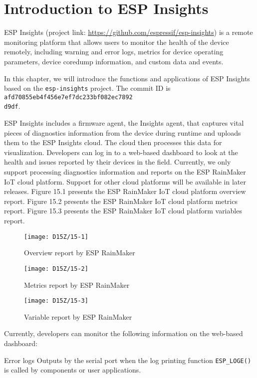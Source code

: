 \documentclass[a4paper,12pt]{book}
\begin{document}
\section{Introduction to ESP Insights}
ESP Insights (project link: \url{https://github.com/espressif/esp-insights}) is a remote monitoring platform that allows users to monitor the health of the device remotely, including warning and error logs, metrics for device operating parameters, device coredump information, and custom data and events.

In this chapter, we will introduce the functions and applications of ESP Insights based on the \verb|esp-insights| project. The commit ID is \verb|afd70855eb4f456e7ef7dc233bf082ec7892|\\ \verb|d9df|.

ESP Insights includes a firmware agent, the Insights agent, that captures vital pieces of diagnostics information from the device during runtime and uploads them to the ESP Insights cloud. The cloud then processes this data for visualization. Developers can log in to a web-based dashboard to look at the health and issues reported by their devices in the field. Currently, we only support processing diagnostics information and reports on the ESP RainMaker IoT cloud platform. Support for other cloud platforms will be available in later releases. Figure 15.1 presents the ESP RainMaker IoT cloud platform overview report. Figure 15.2 presents the ESP RainMaker IoT cloud platform metrics report. Figure 15.3 presents the ESP RainMaker IoT cloud platform variables report.

\begin{figure}[!h]
    \centering
    \texttt{[image: D15Z/15-1]}
    \caption{Overview report by ESP RainMaker}
\end{figure}

\begin{figure}[!h]
    \centering
    \texttt{[image: D15Z/15-2]}
    \caption{Metrics report by ESP RainMaker}
\end{figure}

\begin{figure}[!h]
    \centering
    \texttt{[image: D15Z/15-3]}
    \caption{Variable report by ESP RainMaker}
\end{figure}

Currently, developers can monitor the following information on the web-based dashboard:

\begin{term}{Error logs}
     Outputs by the serial port when the log printing function \verb|ESP_LOGE()| is called by components or user applications.
\end{term}
\end{document}
